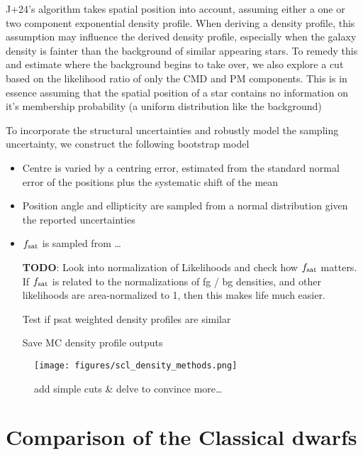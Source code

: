 J+24's algorithm takes spatial position into account, assuming either a
one or two component exponential density profile. When deriving a
density profile, this assumption may influence the derived density
profile, especially when the galaxy density is fainter than the
background of similar appearing stars. To remedy this and estimate where
the background begins to take over, we also explore a cut based on the
likelihood ratio of only the CMD and PM components. This is in essence
assuming that the spatial position of a star contains no information on
it's membership probability (a uniform distribution like the background)

To incorporate the structural uncertainties and robustly model the
sampling uncertainty, we construct the following bootstrap model

\begin{itemize}
\item
  Centre is varied by a centring error, estimated from the standard
  normal error of the positions plus the systematic shift of the mean
\item
  Position angle and ellipticity are sampled from a normal distribution
  given the reported uncertainties
\item
  \(f_{\rm sat}\) is sampled from \ldots{}

  \textbf{TODO}: Look into normalization of Likelihoods and check how
  \(f_{\rm sat}\) matters. If \(f_{\rm sat}\) is related to the
  normalizations of fg / bg densities, and other likelihoods are
  area-normalized to 1, then this makes life much easier.

  Test if psat weighted density profiles are similar

  Save MC density profile outputs
\end{itemize}

\begin{figure}
\centering
\texttt{[image: figures/scl\_density\_methods.png]}
\caption[Density profiles]{add simple cuts \& delve to convince
more\ldots{}}\label{fig:sculptor_observed_profiles}
\end{figure}

\section{Comparison of the Classical
dwarfs}\label{comparison-of-the-classical-dwarfs}


